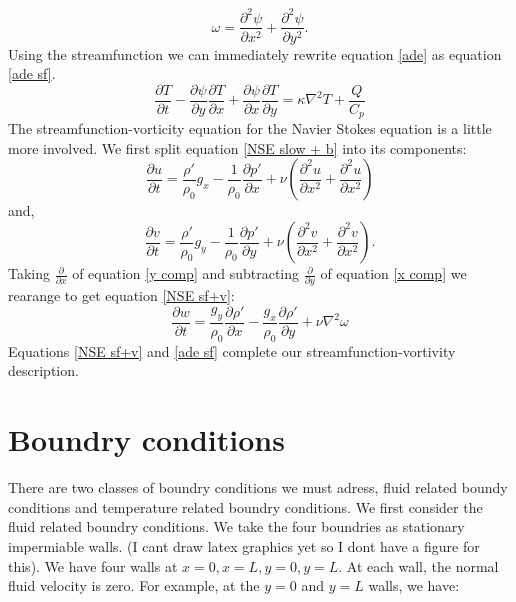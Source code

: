 \documentclass{article}
\begin{document}
\begin{equation}
	\omega = \frac{\partial^2 \psi}{\partial x^2} + \frac{\partial^2 \psi}{\partial y^2}.
	\label{vt to st}
\end{equation}
Using the streamfunction we can immediately rewrite equation \ref{ade} as equation \ref{ade sf}.
\begin{equation}
	\frac{\partial T}{\partial t} -\frac{\partial \psi}{\partial y} \frac{\partial T}{\partial x} + \frac{\partial \psi}{\partial x} \frac{\partial T}{\partial y} = \kappa \nabla^2 T + \frac{Q}{C_p}
	\label{ade sf}
\end{equation}
The streamfunction-vorticity equation for the Navier Stokes equation is a little more involved. We first split equation \ref{NSE slow + b} into its components:
\begin{equation}
	\frac{\partial u}{\partial t} = \frac{\rho'}{\rho_0} g_x -\frac{1}{\rho_0} \frac{\partial p'}{\partial x} + \nu (\frac{\partial^2 u}{\partial x^2} + \frac{\partial^2 u}{\partial x^2})
	\label{x comp}
\end{equation}
and,
\begin{equation}
		\frac{\partial v}{\partial t} = \frac{\rho'}{\rho_0} g_y -\frac{1}{\rho_0} \frac{\partial p'}{\partial y} + \nu (\frac{\partial^2 v}{\partial x^2} + \frac{\partial^2 v}{\partial x^2}).
		\label{y comp}
\end{equation}
Taking $\frac{\partial}{\partial x}$ of equation \ref{y comp} and subtracting $\frac{\partial }{\partial y}$ of equation \ref{x comp} we rearange to get equation \ref{NSE sf+v}:
\begin{equation}
	\frac{\partial w}{\partial t} = \frac{g_y}{\rho_0} \frac{\partial \rho'}{\partial x} - \frac{g_x}{\rho_0} \frac{\partial \rho'}{\partial y} + \nu \nabla^2 \omega
	\label{NSE sf+v}
\end{equation}
Equations \ref{NSE sf+v} and \ref{ade sf} complete our streamfunction-vortivity description.

\section*{Boundry conditions}
There are two classes of boundry conditions we must adress, fluid related boundy conditions and temperature related boundry conditions. We first consider the fluid related boundry conditions. We take the four boundries as stationary impermiable walls. (I cant draw latex graphics yet so I dont have a figure for this). We have four walls at $x=0,x=L,y=0,y=L$. At each wall, the normal fluid velocity is zero. For example, at the $y=0$ and $y=L$ walls, we have:
\end{document}
